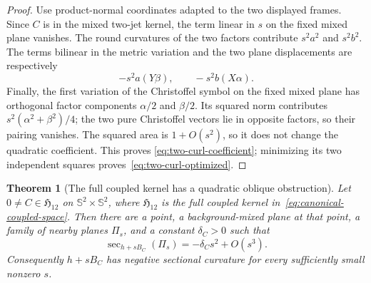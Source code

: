 \documentclass[11pt]{amsart}
\newtheorem{theorem}{Theorem}[section]
\theoremstyle{definition}
\theoremstyle{remark}
\DeclareMathOperator{\secop}{sec}
\newcommand{\Sph}{\mathbb S}
\begin{document}
\begin{proof}
Use product-normal coordinates adapted to the two displayed frames.
Since $C$ is in the mixed two-jet kernel, the
term linear in $s$ on the fixed mixed plane vanishes.  The round
curvatures of the two factors contribute $s^2a^2$ and $s^2b^2$.
The terms bilinear in the metric variation and the two plane
displacements are respectively
\[
 -s^2a(Y\beta),\qquad -s^2b(X\alpha).
\]
Finally, the first variation of the Christoffel symbol on the fixed
mixed plane has orthogonal factor components $\alpha/2$ and
$\beta/2$.  Its squared norm contributes
$s^2(\alpha^2+\beta^2)/4$; the two pure Christoffel vectors lie in
opposite factors, so their pairing vanishes.  The squared area is
$1+O(s^2)$, so it does not change the quadratic coefficient.  This proves
\eqref{eq:two-curl-coefficient}; minimizing its two independent
squares proves~\eqref{eq:two-curl-optimized}.
\end{proof}

\begin{theorem}[The full coupled kernel has a quadratic oblique obstruction]
\label{thm:full-kernel-obstruction}
Let $0\neq C\in\mathfrak H_{12}$ on
$\Sph^2\times\Sph^2$, where $\mathfrak H_{12}$ is the full coupled
kernel in~\eqref{eq:canonical-coupled-space}.  Then there are a point,
a background-mixed plane at that point, a family of nearby planes
$\Pi_s$, and a constant $\delta_C>0$ such that
\begin{equation}\label{eq:full-kernel-negative}
 \secop_{h+sB_C}(\Pi_s)=-\delta_Cs^2+O(s^3).
\end{equation}
Consequently $h+sB_C$ has negative sectional curvature for every
sufficiently small nonzero $s$.
\end{theorem}
\end{document}
